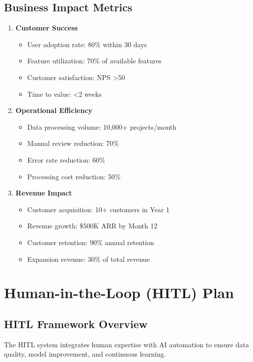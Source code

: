 \documentclass[business]{../templates/infraradar-main}
\begin{document}
\subsection{Business Impact Metrics}
\begin{enumerate}
    \item \textbf{Customer Success}
    \begin{itemize}
        \item User adoption rate: 80\% within 30 days
        \item Feature utilization: 70\% of available features
        \item Customer satisfaction: NPS >50
        \item Time to value: <2 weeks
    \end{itemize}
    
    \item \textbf{Operational Efficiency}
    \begin{itemize}
        \item Data processing volume: 10,000+ projects/month
        \item Manual review reduction: 70\%
        \item Error rate reduction: 60\%
        \item Processing cost reduction: 50\%
    \end{itemize}
    
    \item \textbf{Revenue Impact}
    \begin{itemize}
        \item Customer acquisition: 10+ customers in Year 1
        \item Revenue growth: \$500K ARR by Month 12
        \item Customer retention: 90\% annual retention
        \item Expansion revenue: 30\% of total revenue
    \end{itemize}
\end{enumerate}

\section{Human-in-the-Loop (HITL) Plan}

\subsection{HITL Framework Overview}
The HITL system integrates human expertise with AI automation to ensure data quality, model improvement, and continuous learning.
\end{document}
